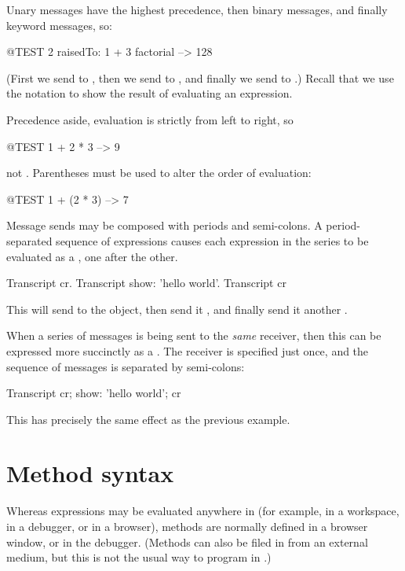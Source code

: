 \documentclass[a4paper,10pt,twoside]{book}
\begin{document}
Unary messages have the highest precedence, then binary messages, and finally keyword messages, so:
\begin{code}{@TEST}
2 raisedTo: 1 + 3 factorial --> 128
\end{code}
(First we send  to , then we send  to , and finally we send  to .)  
Recall that we use the notation \ct{-->} to show the result of evaluating an expression.

Precedence aside, evaluation is strictly from left to right, so
\begin{code}{@TEST}
1 + 2 * 3 --> 9
\end{code}
not .
Parentheses must be used to alter the order of evaluation:
\begin{code}{@TEST}
1 + (2 * 3) --> 7
\end{code}

Message sends may be composed with periods and semi-colons. A period-separated sequence of expressions causes each expression in the series to be evaluated as a , one after the other.

\begin{code}{}
Transcript cr.
Transcript show: 'hello world'.
Transcript cr
\end{code}

\noindent
This will send  to the  object, then send it , and finally send it another .

When a series of messages is being sent to the \emph{same} receiver, then this can be expressed more succinctly as a .
The receiver is specified just once, and the sequence of messages is separated by semi-colons:

\begin{code}{}
Transcript cr;
    show: 'hello world';
    cr
\end{code}
This has precisely the same effect as the previous example.

\section{Method syntax}

Whereas expressions may be evaluated anywhere in \pharo (for example, in a workspace, in a debugger, or in a browser), methods are normally defined in a browser window, or in the debugger.
(Methods can also be filed in from an external medium, but this is not the usual way to program in \pharo.)
\end{document}
